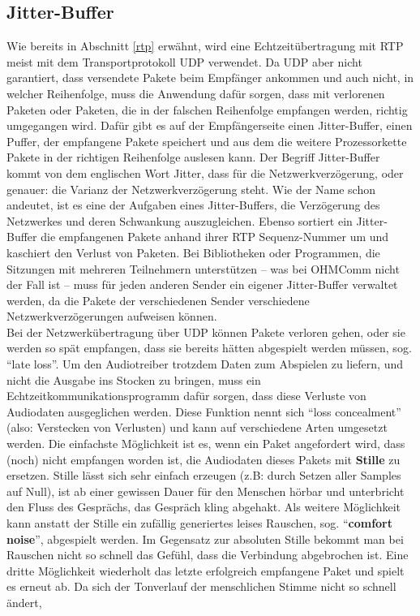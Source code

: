 \subsection{Jitter-Buffer}
\label{jitterBuffer}
Wie bereits in Abschnitt \ref{rtp} erwähnt, wird eine Echtzeitübertragung mit RTP meist mit dem Transportprotokoll UDP verwendet. Da UDP aber nicht garantiert, dass versendete Pakete beim Empfänger ankommen und auch nicht, in welcher Reihenfolge, muss die Anwendung dafür sorgen, dass mit verlorenen Paketen oder Paketen, die in der falschen Reihenfolge empfangen werden, richtig umgegangen wird. Dafür gibt es auf der Empfängerseite einen Jitter-Buffer, einen Puffer, der empfangene Pakete speichert und aus dem die weitere Prozessorkette Pakete in der richtigen Reihenfolge auslesen kann. Der Begriff Jitter-Buffer kommt von dem englischen Wort Jitter, dass für die Netzwerkverzögerung, oder genauer: die Varianz der Netzwerkverzögerung steht. Wie der Name schon andeutet, ist es eine der Aufgaben eines Jitter-Buffers, die Verzögerung des Netzwerkes und deren Schwankung auszugleichen. Ebenso sortiert ein Jitter-Buffer die empfangenen Pakete anhand ihrer RTP Sequenz-Nummer um und kaschiert den Verlust von Paketen. Bei Bibliotheken oder Programmen, die Sitzungen mit mehreren Teilnehmern unterstützen -- was bei OHMComm nicht der Fall ist -- muss für jeden anderen Sender ein eigener Jitter-Buffer verwaltet werden, da die Pakete der verschiedenen Sender verschiedene Netzwerkverzögerungen aufweisen können.
\\
Bei der Netzwerkübertragung über UDP können Pakete verloren gehen, oder sie werden so spät empfangen, dass sie bereits hätten abgespielt werden müssen, sog. \enquote{late loss}. Um den Audiotreiber trotzdem Daten zum Abspielen zu liefern, und nicht die Ausgabe ins Stocken zu bringen, muss ein Echtzeitkommunikationsprogramm dafür sorgen, dass diese Verluste von Audiodaten ausgeglichen werden. Diese Funktion nennt sich \enquote{loss concealment} (also: Verstecken von Verlusten) und kann auf verschiedene Arten umgesetzt werden. Die einfachste Möglichkeit ist es, wenn ein Paket angefordert wird, dass (noch) nicht empfangen worden ist, die Audiodaten dieses Pakets mit \textbf{Stille} zu ersetzen. Stille lässt sich sehr einfach erzeugen (z.B: durch Setzen aller Samples auf Null), ist ab einer gewissen Dauer für den Menschen hörbar und unterbricht den Fluss des Gesprächs, das Gespräch kling abgehakt. Als weitere Möglichkeit kann anstatt der Stille ein zufällig generiertes leises Rauschen, sog. \enquote{\textbf{comfort noise}}, abgespielt werden. Im Gegensatz zur absoluten Stille bekommt man bei Rauschen nicht so schnell das Gefühl, dass die Verbindung abgebrochen ist. Eine dritte Möglichkeit wiederholt das letzte erfolgreich empfangene Paket und spielt es erneut ab. Da sich der Tonverlauf der menschlichen Stimme nicht so schnell ändert, %
